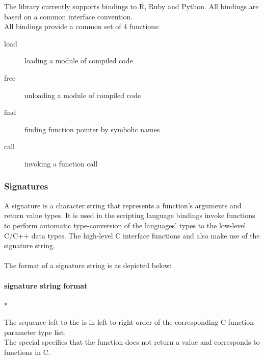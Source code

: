The  library currently supports bindings to R, Ruby and Python.
All bindings are based on a common interface convention.\\
All bindings provide a common set of 4 functions:
\begin{description}
\item [load] loading a module of compiled code
\item [free] unloading a module of compiled code
\item [find] finding function pointer by symbolic names
\item [call] invoking a function call
\end{description}

\pagebreak

\subsubsection{Signatures}

A signature is a character string that represents a function's arguments and
return value types. It is used in the scripting language bindings invoke
functions to perform automatic type-conversion of the languages' types to the
low-level C/C++ data types.
The high-level C interface functions  and 
also make use of the  signature string.\\
\\
The format of a  signature string is as depicted below:


\paragraph{ signature string format}

\begin{center}
* \sigchar{)}  \\
\end{center}

The  sequence left to the
\sigchar{)} is in left-to-right order of the corresponding C function
parameter type list.\\
The special   specifies
that the function does not return a value and corresponds to 
functions in C.

